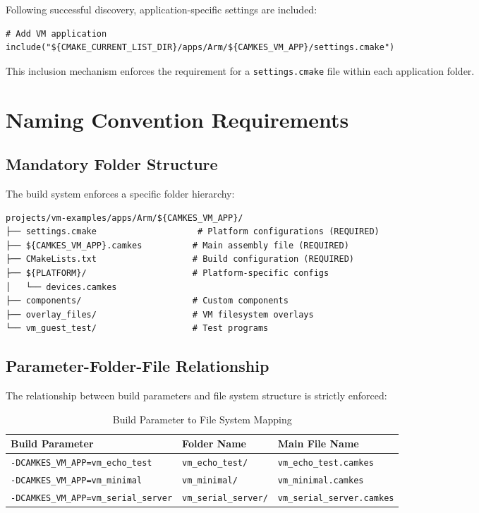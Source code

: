 \documentclass[12pt,a4paper]{article}
\begin{document}
Following successful discovery, application-specific settings are included:

\begin{lstlisting}[style=cmake, caption=Application settings inclusion]
# Add VM application
include("${CMAKE_CURRENT_LIST_DIR}/apps/Arm/${CAMKES_VM_APP}/settings.cmake")
\end{lstlisting}

This inclusion mechanism enforces the requirement for a \texttt{settings.cmake} file within each application folder.

\section{Naming Convention Requirements}

\subsection{Mandatory Folder Structure}

The build system enforces a specific folder hierarchy:

\begin{lstlisting}[style=bash, caption=Required folder structure]
projects/vm-examples/apps/Arm/${CAMKES_VM_APP}/
├── settings.cmake                    # Platform configurations (REQUIRED)
├── ${CAMKES_VM_APP}.camkes          # Main assembly file (REQUIRED)  
├── CMakeLists.txt                   # Build configuration (REQUIRED)
├── ${PLATFORM}/                     # Platform-specific configs
│   └── devices.camkes
├── components/                      # Custom components
├── overlay_files/                   # VM filesystem overlays
└── vm_guest_test/                   # Test programs
\end{lstlisting}

\subsection{Parameter-Folder-File Relationship}

The relationship between build parameters and file system structure is strictly enforced:

\begin{table}[htbp]
\centering
\caption{Build Parameter to File System Mapping}
\label{tab:parameter-mapping}
\begin{tabular}{@{}lll@{}}
\toprule
Build Parameter & Folder Name & Main File Name \\
\midrule
\texttt{-DCAMKES\_VM\_APP=vm\_echo\_test} & \texttt{vm\_echo\_test/} & \texttt{vm\_echo\_test.camkes} \\
\texttt{-DCAMKES\_VM\_APP=vm\_minimal} & \texttt{vm\_minimal/} & \texttt{vm\_minimal.camkes} \\
\texttt{-DCAMKES\_VM\_APP=vm\_serial\_server} & \texttt{vm\_serial\_server/} & \texttt{vm\_serial\_server.camkes} \\
\bottomrule
\end{tabular}
\end{table}
\end{document}
